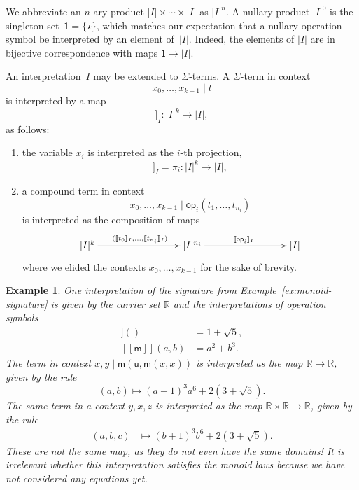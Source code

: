 \documentclass{amsart}
\newcommand{\RR}{\mathbb{R}}
\newcommand{\op}{\mathsf{op}}
\newcommand{\one}{\mathsf{1}}
\newcommand{\sem}[1]{[\![#1]\!]}
\newtheorem{example}[definition]{Example}
\begin{document}
We abbreviate an $n$-ary product $|I| \times \cdots \times |I|$ as $|I|^n$. A nullary product
$|I|^0$ is the singleton set~$\one = \{\star\}$, which matches our expectation that a
nullary operation symbol be interpreted by an element of~$|I|$. Indeed, the elements of $|I|$
are in bijective correspondence with maps $\one \to |I|$.

An interpretation~$I$ may be extended to $\Sigma$-terms. A $\Sigma$-term in context
%
\begin{equation*}
  x_0, \ldots, x_{k-1} \mid t
\end{equation*}
%
is interpreted by a map
%
\begin{equation*}
  \sem{x_0, \ldots, x_{k-1} \mid t}_I : |I|^k \to |I|,
\end{equation*}
%
as follows:
%
\begin{enumerate}
\item the variable $x_i$ is interpreted as the $i$-th projection,
  \begin{equation*}
    \sem{x_0, \ldots, x_{k-1} \mid  x_i}_I = \pi_i : |I|^k \to |I|,
  \end{equation*}
\item a compound term in context
  \begin{equation*}
    x_0, \ldots, x_{k-1} \mid \op_i(t_1, \ldots, t_{n_i})
  \end{equation*}
  is interpreted as the composition of maps
  \begin{equation*}
    \xymatrix@+6em{
      {|I|^k} \ar[r]^{(\sem{t_0}_I, \ldots, \sem{t_{n_i}}_I)}
      &
      {|I|^{n_i}} \ar[r]^{\sem{\op_i}_I}
      &
      {|I|}
    }
  \end{equation*}
  where we elided the contexts $x_0, \ldots, x_{k-1}$ for the sake of brevity.
\end{enumerate}

\begin{example}
  One interpretation of the signature from Example~\ref{ex:monoid-signature} is given by
  the carrier set $\RR$ and the interpretations of operation symbols
  \begin{align*}
    \sem{\mathsf{u}}() &= 1 + \sqrt{5}, \\
    \sem{\mathsf{m}}(a, b) &= a^2 + b^3.
  \end{align*}
  The term in context $x, y \mid \mathsf{m}(\mathsf{u}, \mathsf{m}(x, x))$ is interpreted
  as the map $\RR \to \RR$, given by the rule
  \begin{equation*}
    (a, b) \mapsto (a+1)^3 a^6 + 2 (3 + \sqrt{5}).
  \end{equation*}
  The same term in a context $y, x, z$ is interpreted as the map $\RR \times \RR \to \RR$,
  given by the rule
  \begin{align*}
    (a, b, c) &\mapsto (b+1)^3 b^6 + 2 (3 + \sqrt{5}).
  \end{align*}
  These are not the same map, as they do not even have the same domains! It is irrelevant
  whether this interpretation satisfies the monoid laws because we have not considered any
  equations yet.
\end{example}
\end{document}
